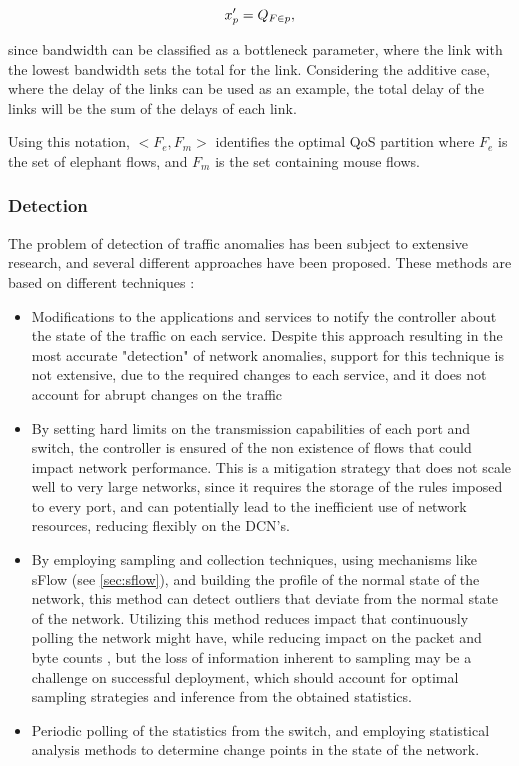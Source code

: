\begin{equation*}
    \centering
    x'_p = Q_{F \in p},
\end{equation*}

since bandwidth can be classified as a bottleneck parameter, where the link with the lowest bandwidth sets the total for the link. Considering the additive case, 
where the delay of the links can be used as an example, the total delay of the links will be the sum of the delays of each link.

\par Using this notation, $<F_e, F_m>$ identifies the optimal QoS partition where $F_e$ is the set of elephant flows, and $F_m$ is the set containing 
mouse flows. 

\subsubsection{Detection}

The problem of detection of traffic anomalies has been subject to extensive research, and several different approaches have been proposed. These methods are
based on different techniques \cite{curtis_mahout:_2011}:

\begin {itemize}
    \item Modifications to the applications and services to notify the controller about the state of the traffic on each service. Despite this approach resulting
         in the most accurate "detection" of network anomalies, support for this technique is not extensive, due to the required changes to each service, 
         and it does not account for abrupt changes on the traffic
    \item By setting hard limits on the transmission capabilities of each port and switch, the controller is ensured of the non existence of flows that could 
        impact network performance. This is a mitigation strategy that does not scale well to very large networks, since it requires the storage of the rules
        imposed to every port, and can potentially lead to the inefficient use of network resources, reducing flexibly on the DCN's.
    \item By employing sampling and collection techniques, using mechanisms like sFlow (see \ref{sec:sflow}), and building the profile of the normal state of 
        the network,
        this method can detect outliers that deviate from the normal state of the network. Utilizing this method reduces impact that continuously polling the network
        might have, while reducing impact on the packet and byte counts \cite{brauckhoff_impact_2006}, but 
        the loss of information inherent to sampling may be a challenge on successful deployment, which should account for optimal sampling 
        strategies and inference from the obtained statistics.
    \item Periodic polling of the statistics from the switch, and employing statistical analysis methods to determine change points in the state of the network.
\end {itemize}

